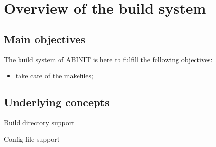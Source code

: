 \chapter{Overview of the build system}

\section{Main objectives}

The build system of ABINIT is here to fulfill the following objectives:
\begin{itemize}
 \item
 take care of the makefiles;
\end{itemize}

\section{Underlying concepts}

Build directory support

Config-file support

